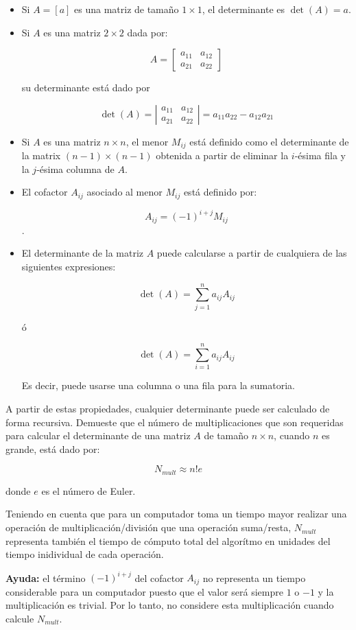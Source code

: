 \documentclass[a4,useAMS,usenatbib,usegraphicx,12pt]{article}
\begin{document}
\begin{itemize}
 \begin{itemize}
  \item Si $A=[a]$ es una matriz de tamaño $1\times 1$, el determinante es $\det(A) = a$.
  \item Si $A$ es una matriz $2\times 2$ dada por:
  
  $$ A = \left[\begin{matrix} a_{11} & a_{12} \\ a_{21} & a_{22} \end{matrix}\right] $$
  
  su determinante está dado por
  
  $$ \det(A) = \left|\begin{matrix} a_{11} & a_{12} \\ a_{21} & a_{22} \end{matrix}\right| = a_{11}a_{22}-a_{12}a_{21} $$
  
  \item Si $A$ es una matriz $n\times n$, el menor $M_{ij}$ está definido como el determinante de la matrix $(n-1)\times (n-1)$
  obtenida a partir de eliminar la $i$-ésima fila y la $j$-ésima columna de $A$.
  
  \item El cofactor $A_{ij}$ asociado al menor $M_{ij}$ está definido por:
  
  $$ A_{ij} = (-1)^{i+j}M_{ij} $$.
  
  \item El determinante de la matriz $A$ puede calcularse a partir de cualquiera de las siguientes
  expresiones:
  
  $$ \det(A) = \sum_{j=1}^n a_{ij}A_{ij} $$
  
  ó
  
  $$ \det(A) = \sum_{i=1}^n a_{ij}A_{ij} $$
  
  Es decir, puede usarse una columna o una fila para la sumatoria.
  
 \end{itemize}

A partir de estas propiedades, cualquier determinante puede ser calculado de forma recursiva.
Demueste que el número de multiplicaciones que son requeridas para calcular el determinante 
de una matriz $A$ de tamaño $n\times n$, cuando $n$ es grande, está dado por:

$$ N_{mult} \approx n!e $$

donde $e$ es el número de Euler.

Teniendo en cuenta que para un computador toma un tiempo mayor realizar una operación de 
multiplicación/división que una operación suma/resta, $N_{mult}$ representa también el tiempo
de cómputo total del algorítmo en unidades del tiempo inidividual de cada operación.
 
 
\textbf{Ayuda:} el término $(-1)^{i+j}$ del cofactor $A_{ij}$ no representa un tiempo considerable
para un computador puesto que el valor será siempre $1$ o $-1$ y la multiplicación es trivial.
Por lo tanto, no considere esta multiplicación cuando calcule $N_{mult}$.
 
\end{itemize}

\end{document}
